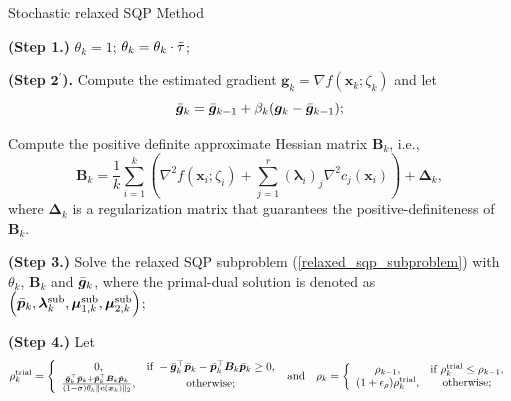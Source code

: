 \documentclass[aos]{imsart}
\numberwithin{equation}{section}
\theoremstyle{plain}
\begin{document}
\begin{algorithm}[htb]
 \caption{Stochastic relaxed SQP Method}
 \label{alg_stoch_relaxed_sqp_averaging_grad_Bk}
 \begin{algorithmic}[1]
 \renewcommand{\algorithmicrequire}{\textbf{Input:} $\bm{\ell} \leq \bm{x}_0 \leq \bm{u}$, $\tau, \Tilde{\tau} \in (0,1)$, $\sigma \in (0,1)$, $\rho_{-1} >0$, $\epsilon_{\rho}, \epsilon_{\xi}, \beta \in (0,1)$, $\mu \in (0,1)$, $\varrho>0$, $\{\beta_k\}_{k=0}^{\infty}$, $\{\gamma_k\}_{k=0}^{\infty}$.}
 \REQUIRE 
  \STATE \textbf{(Step 1.)} $\theta_k = 1$;
  \STATE $\theta_k = \theta_k \cdot \Tilde{\tau}$;

  \ENDWHILE

  \STATE \textbf{(Step} $\mathbf{2^{\prime}}$\textbf{).} Compute the estimated gradient $\bm{g}_k = \nabla f(\bm{x}_k; \zeta_{k})$ and let 
  \begin{equation*}
      \Bar{\bm{g}}_k = \Bar{\bm{g}}_{k-1} + \beta_k (\bm{g}_k - \Bar{\bm{g}}_{k-1});
  \end{equation*}

  \STATE Compute the positive definite approximate Hessian matrix $\bm{B}_k$, i.e., \begin{equation*}
        \bm{B}_k = \frac{1}{k} \sum_{i=1}^{k} \left( \nabla^2 f(\bm{x}_i; \zeta_{i}) + \sum_{j=1}^{r} \left( \bm{\lambda}_{i}\right)_{j}\nabla^2 c_j(\bm{x}_{i})\right) + \bm{\Delta}_k,
\end{equation*}
 where $\bm{\Delta}_k$ is a regularization matrix that guarantees the positive-definiteness of $\bm{B}_k$. 
  
  \STATE \textbf{(Step 3.)} Solve the relaxed SQP subproblem (\ref{relaxed_sqp_subproblem}) with $\theta_k$, $\bm{B}_k$ and $\Bar{\bm{g}}_{k}$, where the primal-dual solution is denoted as $\left(\Bar{\bm{p}}_k,  \bm{\lambda}_k^{\text{sub}}, \bm{\mu}_{1,k}^{\text{sub}}, \bm{\mu}_{2,k}^{\text{sub}} \right)$;

  \STATE \textbf{(Step 4.)} Let \begin{equation*}
        \rho_k^{\text{trial}} = \left \{ \begin{array}{cc}
           0,  & \text{if}~ -\Bar{\bm{g}}_k^{\top} \Bar{\bm{p}}_k - \Bar{\bm{p}}_k^{\top} \bm{B}_k \Bar{\bm{p}}_k \geq 0, \\
           \frac{\Bar{\bm{g}}_k^{\top} \Bar{\bm{p}}_k + \Bar{\bm{p}}_k^{\top} \bm{B}_k \Bar{\bm{p}}_k}{(1-\sigma)\theta_k \|\bm{c}(\bm{x}_k)\|_2},  &  \text{otherwise;}
        \end{array}\right.
        ~\text{and} \quad 
         \rho_k = \left\{ \begin{array}{cc}
        \rho_{k-1}, &  \text{if}~\rho_{k}^{\text{trial}} \leq \rho_{k-1}, \\
        (1+\epsilon_{\rho})\rho_{k}^{\text{trial}}, & \text{otherwise};
    \end{array} \right.
         \end{equation*}


\end{algorithmic}
\end{algorithm}
\end{document}
